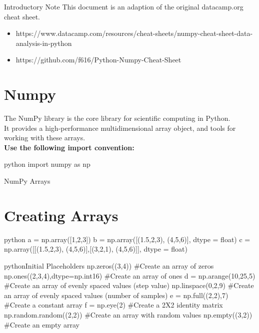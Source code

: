 \begin{alerttextbox}{Introductory Note}
This document is an adaption of the original datacamp.org cheat sheet.\\
\begin{itemize}
    \item {https://www.datacamp.com/resources/cheat-sheets/numpy-cheat-sheet-data-analysis-in-python}
    \item {https://github.com/f616/Python-Numpy-Cheat-Sheet}
\end{itemize}

\end{alerttextbox}


\section{Numpy}

\begin{myblock}{}
The NumPy library is the core library for scientific computing in Python.\\
It provides a high-performance multidimensional array object, and tools for working with these arrays.\\

\textbf{Use the following import convention:}
\begin{codebox}{python}{}
import numpy as np
\end{codebox}

\begin{myblock}{NumPy Arrays}
\end{myblock}

\end{myblock}

\section{Creating Arrays}

\begin{codebox}{python}{}
a = np.array([1,2,3])
b = np.array([(1.5,2,3), (4,5,6)], dtype = float)
c = np.array([[(1.5,2,3), (4,5,6)],[(3,2,1), (4,5,6)]], dtype = float)
\end{codebox}

\begin{codebox}{python}{Initial Placeholders}
np.zeros((3,4))  #Create an array of zeros
np.ones((2,3,4),dtype=np.int16)  #Create an array of ones
d = np.arange(10,25,5)  #Create an array of evenly spaced values (step value)
np.linspace(0,2,9)  #Create an array of evenly spaced values (number of samples)
e = np.full((2,2),7)  #Create a constant array
f = np.eye(2)  #Create a 2X2 identity matrix
np.random.random((2,2))  #Create an array with random values
np.empty((3,2))  #Create an empty array
\end{codebox}


